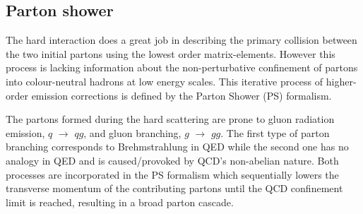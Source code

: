 \subsection{Parton shower} \label{sec::PS}

The hard interaction does a great job in describing the primary collision between the two initial partons using the lowest order matrix-elements. However this process is lacking information about the non-perturbative confinement of partons into colour-neutral hadrons at low energy scales. This iterative process of higher-order emission corrections is defined by the Parton Shower (PS) formalism.

The partons formed during the hard scattering are prone to gluon radiation emission, $q$ $\rightarrow$ $qg$, and gluon branching, $g$ $\rightarrow$ $gg$. The first type of parton branching corresponds to Brehmstrahlung in QED while the second one has no analogy in QED and is caused/provoked by QCD's non-abelian nature. Both processes are incorporated in the PS formalism which sequentially lowers the transverse momentum of the contributing partons until the QCD confinement limit is reached, resulting in a broad parton cascade.
\\

